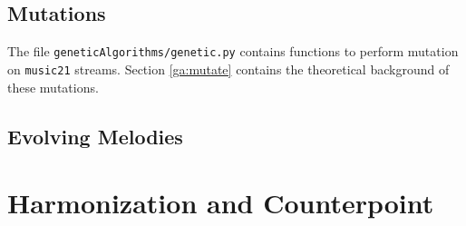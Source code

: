 \subsection{Mutations}

The file \texttt{geneticAlgorithms/genetic.py} contains functions to perform mutation on \texttt{music21} streams.
Section \ref{ga:mutate} contains the theoretical background of these mutations.

\subsection{Evolving Melodies}



\section{Harmonization and Counterpoint}
